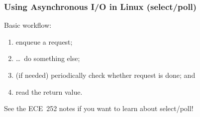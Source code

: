 \begin{frame}
  \frametitle{Using Asynchronous I/O in Linux (select/poll)}


   Basic workflow: \\[1em]
   \begin{enumerate}
     \item enqueue a request;
     \item \ldots ~do something else;
     \item (if needed) periodically check whether request is done; and
     \item read the return value.
   \end{enumerate}

See the ECE~252 notes if you want to learn about select/poll!
  
\end{frame}





